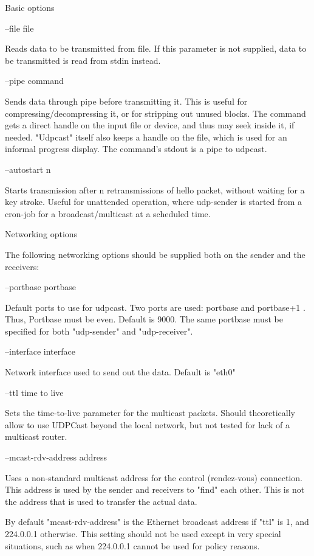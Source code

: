 Basic options\cite{man:udp-sender}

--file file

Reads data to be transmitted from file. If this parameter is not
supplied, data to be transmitted is read from stdin instead.

--pipe command

Sends data through pipe before transmitting it. This is useful for
compressing/decompressing it, or for stripping out unused blocks. The
command gets a direct handle on the input file or device, and thus may seek
inside it, if needed. "Udpcast" itself also keeps a handle on the file,
which is used for an informal progress display. The command's stdout is a
pipe to udpcast.

--autostart n

Starts transmission after n retransmissions of hello packet, without
waiting for a key stroke. Useful for unattended operation, where udp-sender
is started from a cron-job for a broadcast/multicast at a scheduled time.

Networking options

The following networking options should be supplied both on the sender and
the receivers:

--portbase portbase

    Default ports to use for udpcast. Two ports are used: portbase and
portbase+1 . Thus, Portbase must be even. Default is 9000. The same
portbase must be specified for both "udp-sender" and "udp-receiver".

--interface interface

    Network interface used to send out the data. Default is "eth0"

--ttl time to live

    Sets the time-to-live parameter for the multicast packets. Should
theoretically allow to use UDPCast beyond the local network, but not tested
for lack of a multicast router.

--mcast-rdv-address address

    Uses a non-standard multicast address for the control (rendez-vous)
connection. This address is used by the sender and receivers to "find" each
other. This is not the address that is used to transfer the actual data.

    By default "mcast-rdv-address" is the Ethernet broadcast address if
"ttl" is 1, and 224.0.0.1 otherwise. This setting should not be used except
in very special situations, such as when 224.0.0.1 cannot be used for
policy reasons.

